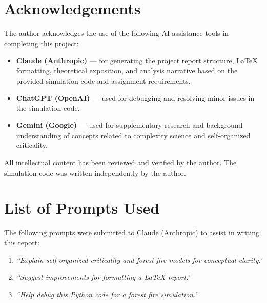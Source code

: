\documentclass[12pt, a4paper]{article}
\begin{document}
\section*{Acknowledgements}

The author acknowledges the use of the following AI assistance tools in completing
this project:
\begin{itemize}
    \item \textbf{Claude (Anthropic)} — for generating the project report structure,
    LaTeX formatting, theoretical exposition, and analysis narrative based on the
    provided simulation code and assignment requirements.
    \item \textbf{ChatGPT (OpenAI)} — used for debugging and resolving minor issues in the simulation code.  
    \item \textbf{Gemini (Google)} — used for supplementary research and background understanding of concepts related to complexity science and self-organized criticality.  
 
\end{itemize}

All intellectual content has been reviewed and verified by the author. The simulation
code was written independently by the author.

\section*{List of Prompts Used}

The following prompts were submitted to Claude (Anthropic) to assist in writing this
report:

\begin{enumerate}
    \item \textit{``Explain self-organized criticality and forest fire models for conceptual clarity.'}
    \item \textit{``Suggest improvements for formatting a LaTeX report.'}
    \item \textit{``Help debug this Python code for a forest fire simulation.'}
\end{enumerate}
\end{document}
